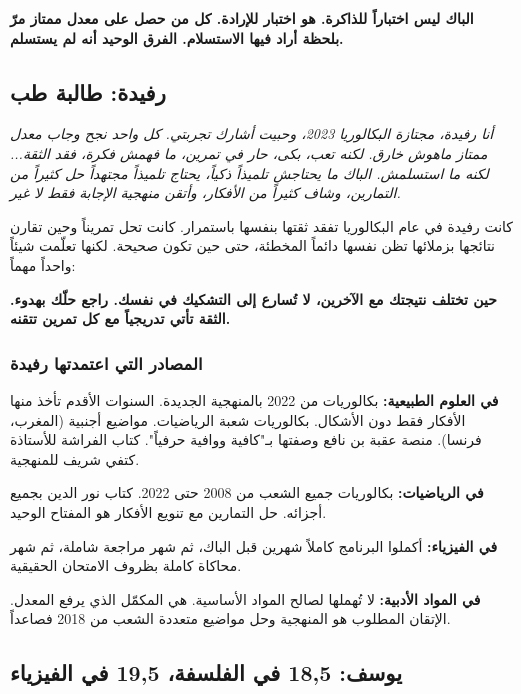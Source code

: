 \documentclass[12pt,a4paper]{book}
\newcommand{\quoteAr}[1]{%
	\begin{myquote}
		\itshape #1
	\end{myquote}
}
\newcommand{\importantAr}[1]{%
	\begin{important}
		\bfseries #1
	\end{important}
}
\begin{document}
\importantAr{الباك ليس اختباراً للذاكرة. هو اختبار للإرادة. كل من حصل على معدل ممتاز مرّ بلحظة أراد فيها الاستسلام. الفرق الوحيد أنه لم يستسلم.}


\subsection{رفيدة: طالبة طب}

\quoteAr{أنا رفيدة، مجتازة البكالوريا 2023، وحبيت أشارك تجربتي. كل واحد نجح وجاب معدل ممتاز ماهوش خارق. لكنه تعب، بكى، حار في تمرين، ما فهمش فكرة، فقد الثقة... لكنه ما استسلمش. الباك ما يحتاجش تلميذاً ذكياً، يحتاج تلميذاً مجتهداً حل كثيراً من التمارين، وشاف كثيراً من الأفكار، وأتقن منهجية الإجابة فقط لا غير.}

كانت رفيدة في عام البكالوريا تفقد ثقتها بنفسها باستمرار. كانت تحل تمريناً وحين تقارن نتائجها بزملائها تظن نفسها دائماً المخطئة، حتى حين تكون صحيحة. لكنها تعلّمت شيئاً واحداً مهماً:

\importantAr{حين تختلف نتيجتك مع الآخرين، لا تُسارع إلى التشكيك في نفسك. راجع حلّك بهدوء. الثقة تأتي تدريجياً مع كل تمرين تتقنه.}

\subsubsection*{المصادر التي اعتمدتها رفيدة}

\textbf{في العلوم الطبيعية:} بكالوريات من 2022 بالمنهجية الجديدة. السنوات الأقدم تأخذ منها الأفكار فقط دون الأشكال. بكالوريات شعبة الرياضيات. مواضيع أجنبية (المغرب، فرنسا). منصة عقبة بن نافع وصفتها بـ"كافية ووافية حرفياً". كتاب الفراشة للأستاذة كتفي شريف للمنهجية.

\textbf{في الرياضيات:} بكالوريات جميع الشعب من 2008 حتى 2022. كتاب نور الدين بجميع أجزائه. حل التمارين مع تنويع الأفكار هو المفتاح الوحيد.

\textbf{في الفيزياء:} أكملوا البرنامج كاملاً شهرين قبل الباك، ثم شهر مراجعة شاملة، ثم شهر محاكاة كاملة بظروف الامتحان الحقيقية.

\textbf{في المواد الأدبية:} لا تُهملها لصالح المواد الأساسية. هي المكمّل الذي يرفع المعدل. الإتقان المطلوب هو المنهجية وحل مواضيع متعددة الشعب من 2018 فصاعداً.

\subsection{يوسف: 18,5 في الفلسفة، 19,5 في الفيزياء}
\end{document}
